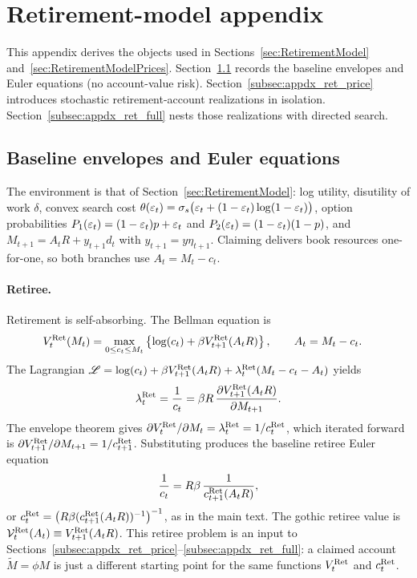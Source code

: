 \section{Retirement-model appendix}\label{sec:appdx_retirement}
This appendix derives the objects used in Sections~\ref{sec:RetirementModel} and~\ref{sec:RetirementModelPrices}. Section~\ref{subsec:appdx_ret_baseline} records the baseline envelopes and Euler equations (no account-value risk). Section~\ref{subsec:appdx_ret_price} introduces stochastic retirement-account realizations in isolation. Section~\ref{subsec:appdx_ret_full} nests those realizations with directed search.

\subsection{Baseline envelopes and Euler equations}\label{subsec:appdx_ret_baseline}
The environment is that of Section~\ref{sec:RetirementModel}: log utility, disutility of work $\delta$, convex search cost $\theta(\varepsilon_t)=\sigma_s\bigl(\varepsilon_t+(1-\varepsilon_t)\log(1-\varepsilon_t)\bigr)$, option probabilities $P_1(\varepsilon_t)=(1-\varepsilon_t)p+\varepsilon_t$ and $P_2(\varepsilon_t)=(1-\varepsilon_t)(1-p)$, and $M_{t+1}=A_t R+y_{t+1}d_t$ with $y_{t+1}=y\eta_{t+1}$. Claiming delivers book resources one-for-one, so both branches use $A_t=M_t-c_t$.

\paragraph{Retiree.}
Retirement is self-absorbing. The Bellman equation is
\begin{align}
	V_t^{\mathrm{Ret}}(M_t)
	&= \max_{0\le c_t\le M_t}
	\left\{
		\log(c_t)+\beta V_{t+1}^{\mathrm{Ret}}(A_t R)
	\right\},
	\qquad A_t=M_t-c_t.
\end{align}
The Lagrangian $\mathscr{L}=\log(c_t)+\beta V_{t+1}^{\mathrm{Ret}}(A_t R)+\lambda_t^{\mathrm{Ret}}(M_t-c_t-A_t)$ yields
\begin{align}
	\lambda_t^{\mathrm{Ret}} = \frac{1}{c_t}
	= \beta R\,\frac{\partial V_{t+1}^{\mathrm{Ret}}(A_t R)}{\partial M_{t+1}}.
\end{align}
The envelope theorem gives $\partial V_t^{\mathrm{Ret}}/\partial M_t=\lambda_t^{\mathrm{Ret}}=1/c_t^{\mathrm{Ret}}$, which iterated forward is $\partial V_{t+1}^{\mathrm{Ret}}/\partial M_{t+1}=1/c_{t+1}^{\mathrm{Ret}}$. Substituting produces the baseline retiree Euler equation
\begin{align}
	\frac{1}{c_t}
	= R\beta\,\frac{1}{c_{t+1}^{\mathrm{Ret}}(A_t R)},
	\label{eq:ret_baseline_euler}
\end{align}
or $c_t^{\mathrm{Ret}}=\bigl(R\beta(c_{t+1}^{\mathrm{Ret}}(A_t R))^{-1}\bigr)^{-1}$, as in the main text. The gothic retiree value is $\mathcal{V}_t^{\mathrm{Ret}}(A_t)\equiv V_{t+1}^{\mathrm{Ret}}(A_t R)$. This retiree problem is an input to Sections~\ref{subsec:appdx_ret_price}--\ref{subsec:appdx_ret_full}: a claimed account $\tilde M=\phi M$ is just a different starting point for the same functions $V_t^{\mathrm{Ret}}$ and $c_t^{\mathrm{Ret}}$.

